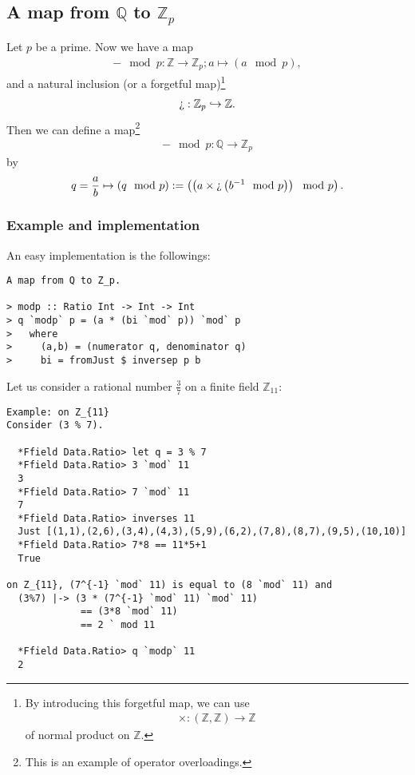 \documentclass[11pt]{book}
\begin{document}
\subsection{A map from $\mathbb{Q}$ to $\mathbb{Z}_p$}
Let $p$ be a prime.
Now we have a map
\begin{eqnarray}
- \mod p : \mathbb{Z} \to \mathbb{Z}_p; a \mapsto (a \mod p),
\end{eqnarray}
and a natural inclusion (or a forgetful map)\footnote{
By introducing this forgetful map, we can use 
\begin{eqnarray}
\times : (\mathbb{Z}, \mathbb{Z}) \to \mathbb{Z} 
\end{eqnarray}
of normal product on $\mathbb{Z}$.
}
\begin{eqnarray}
\text{\textquestiondown} : \mathbb{Z}_p \hookrightarrow \mathbb{Z}.
\end{eqnarray}
Then we can define a map\footnote{
This is an example of operator overloadings.
}
\begin{eqnarray}
- \mod p : \mathbb{Q} \to \mathbb{Z}_p
\end{eqnarray}
by
\begin{eqnarray}
q = \frac{a}{b} \mapsto (q \mod p) := \left( \left( a \times \text{\textquestiondown} \left( b^{-1} \mod p\right) \right) \mod p \right).
\end{eqnarray}

\subsubsection{Example and implementation}
An easy implementation is the followings:
\begin{verbatim}
A map from Q to Z_p.

> modp :: Ratio Int -> Int -> Int
> q `modp` p = (a * (bi `mod` p)) `mod` p
>   where
>     (a,b) = (numerator q, denominator q)
>     bi = fromJust $ inversep p b
\end{verbatim}
Let us consider a rational number $\frac{3}{7}$ on a finite field $\mathbb{Z}_{11}$:
\begin{verbatim}
Example: on Z_{11}
Consider (3 % 7).

  *Ffield Data.Ratio> let q = 3 % 7
  *Ffield Data.Ratio> 3 `mod` 11
  3
  *Ffield Data.Ratio> 7 `mod` 11
  7
  *Ffield Data.Ratio> inverses 11
  Just [(1,1),(2,6),(3,4),(4,3),(5,9),(6,2),(7,8),(8,7),(9,5),(10,10)]
  *Ffield Data.Ratio> 7*8 == 11*5+1
  True

on Z_{11}, (7^{-1} `mod` 11) is equal to (8 `mod` 11) and
  (3%7) |-> (3 * (7^{-1} `mod` 11) `mod` 11)
             == (3*8 `mod` 11) 
             == 2 ` mod 11

  *Ffield Data.Ratio> q `modp` 11
  2
\end{verbatim}
\end{document}
